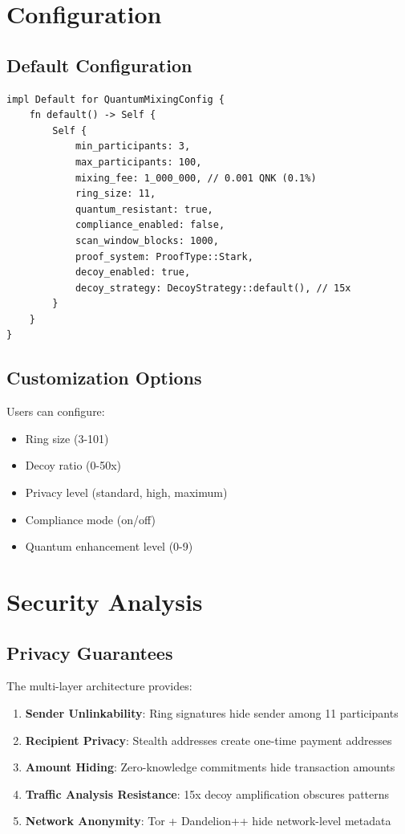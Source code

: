 \documentclass[12pt,a4paper]{article}
\begin{document}
\section{Configuration}

\subsection{Default Configuration}

\begin{lstlisting}[style=rustcode, caption=Default Mixing Configuration]
impl Default for QuantumMixingConfig {
    fn default() -> Self {
        Self {
            min_participants: 3,
            max_participants: 100,
            mixing_fee: 1_000_000, // 0.001 QNK (0.1%)
            ring_size: 11,
            quantum_resistant: true,
            compliance_enabled: false,
            scan_window_blocks: 1000,
            proof_system: ProofType::Stark,
            decoy_enabled: true,
            decoy_strategy: DecoyStrategy::default(), // 15x
        }
    }
}
\end{lstlisting}

\subsection{Customization Options}

Users can configure:
\begin{itemize}
\item Ring size (3-101)
\item Decoy ratio (0-50x)
\item Privacy level (standard, high, maximum)
\item Compliance mode (on/off)
\item Quantum enhancement level (0-9)
\end{itemize}

\section{Security Analysis}

\subsection{Privacy Guarantees}

The multi-layer architecture provides:

\begin{enumerate}
\item \textbf{Sender Unlinkability}: Ring signatures hide sender among 11 participants
\item \textbf{Recipient Privacy}: Stealth addresses create one-time payment addresses
\item \textbf{Amount Hiding}: Zero-knowledge commitments hide transaction amounts
\item \textbf{Traffic Analysis Resistance}: 15x decoy amplification obscures patterns
\item \textbf{Network Anonymity}: Tor + Dandelion++ hide network-level metadata
\end{enumerate}
\end{document}
